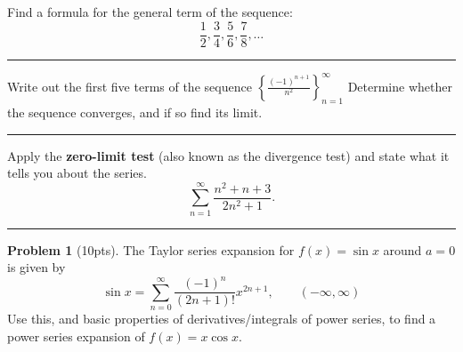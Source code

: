 \documentclass[12pt]{article}
\theoremstyle{definition}
\newtheorem{problem}{Problem}
\begin{document}
\bigskip
{\problem[5 pts] Find a formula for the general term of the sequence:} 
\begin{equation*}
\frac{1}{2}, \frac{3}{4}, \frac{5}{6}, \frac{7}{8}, \dotsc
\end{equation*}
\begin{flushright}
\end{flushright}
\hrule
{\problem[10 pts] Write out the first five terms of the sequence $\left\{ \displaystyle{\frac{(-1)^{n+1}}{n^2}} \right\}_{n=1}^\infty$ \newline Determine whether the sequence converges, and if so find its limit.
\vspace{2cm}
\begin{flushright}
\end{flushright}
\hrule

{\problem[5 pts]  Apply the \textbf{zero-limit test} (also known as
  the divergence test) and state what it tells you about the series.}
\begin{equation*}
\sum_{n=1}^\infty \frac{n^2+n+3}{2n^2+1}.
\end{equation*}
\vspace{2cm}
\hrule
\begin{problem}[10pts]
The Taylor series expansion for $f(x) = \sin x$ around $a=0$ is given by
\begin{equation*}
\sin x = \sum_{n=0}^\infty \frac{(-1)^n}{(2n+1)!} x^{2n+1}, \qquad (-\infty, \infty)
\end{equation*}
Use this, and basic properties of derivatives/integrals of power series, to find a power series expansion of $f(x) = x\cos x$.

\vspace{3cm}
\begin{flushright}
\end{flushright}
\end{problem}
\newpage


}
\end{document}
